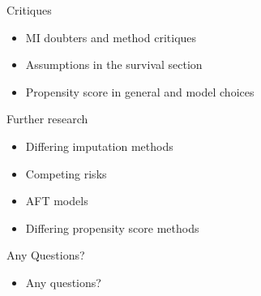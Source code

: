 \begin{frame}{Critiques}
 \begin{itemize}
  \item MI doubters and method critiques
  \item Assumptions in the survival section
  \item Propensity score in general and model choices
 \end{itemize}

\end{frame}

\begin{frame}{Further research}

\begin{itemize}
 \item Differing imputation methods
 \item Competing risks
 \item AFT models
 \item Differing propensity score methods
 
\end{itemize}

 
\end{frame}

\begin{frame}{Any Questions?}
\begin{itemize}
 \item Any questions?
\end{itemize}
\end{frame}
